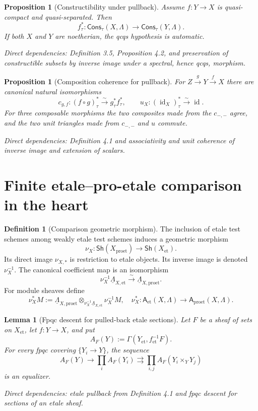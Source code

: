 \documentclass[10pt]{article}
\newtheorem{proposition}[theorem]{Proposition}
\newtheorem{lemma}[theorem]{Lemma}
\theoremstyle{definition}
\newtheorem{definition}[theorem]{Definition}
\newcommand{\Lam}{\Lambda}
\newcommand{\Sh}{\mathsf{Sh}}
\newcommand{\Cons}{\mathsf{Cons}}
\newcommand{\et}{\mathrm{et}}
\newcommand{\proet}{\mathrm{proet}}
\newcommand{\id}{\operatorname{id}}
\newcommand{\dep}[1]{\par\smallskip\noindent\textit{Direct dependencies: #1}}
\begin{document}
\begin{proposition}[Constructibility under pullback]
Assume $f:Y\to X$ is quasi-compact and quasi-separated.  Then
\[
f_\tau^*: \Cons_\tau(X,\Lam)\longrightarrow\Cons_\tau(Y,\Lam).
\]
If both $X$ and $Y$ are noetherian, the qcqs hypothesis is automatic.
\dep{Definition 3.5, Proposition 4.2, and preservation of constructible
subsets by inverse image under a spectral, hence qcqs, morphism.}
\end{proposition}

\begin{proposition}[Composition coherence for pullback]
For $Z\xrightarrow{g}Y\xrightarrow{f}X$ there are canonical natural
isomorphisms
\[
c_{g,f}:(f\circ g)_\tau^*\xrightarrow{\sim}g_\tau^*f_\tau^*,
\qquad
u_X:(\id_X)_\tau^*\xrightarrow{\sim}\id.
\]
For three composable morphisms the two composites made from the $c_{-,-}$
agree, and the two unit triangles made from $c_{-,-}$ and $u$ commute.
\dep{Definition 4.1 and associativity and unit coherence of inverse image and
extension of scalars.}
\end{proposition}

\section{Finite etale--pro-etale comparison in the heart}

\begin{definition}[Comparison geometric morphism]
The inclusion of etale test schemes among weakly etale test schemes induces a
geometric morphism
\[
\nu_X:\Sh(X_{\proet})\longrightarrow\Sh(X_{\et}).
\]
Its direct image $\nu_{X,*}$ is restriction to etale objects.  Its inverse
image is denoted $\nu_X^{-1}$.  The canonical coefficient map is an
isomorphism
\[
\nu_X^{-1}\underline\Lam_{X,\et}
\xrightarrow{\sim}\underline\Lam_{X,\proet}.
\]
For module sheaves define
\[
\nu_X^*M:=\underline\Lam_{X,\proet}
\otimes_{\nu_X^{-1}\underline\Lam_{X,\et}}\nu_X^{-1}M,
\quad
\nu_X^*: \mathsf A_\et(X,\Lam)\to\mathsf A_\proet(X,\Lam).
\]
\end{definition}

\begin{lemma}[Fpqc descent for pulled-back etale sections]
Let $F$ be a sheaf of sets on $X_\et$, let $f:Y\to X$, and put
\[
A_F(Y):=\Gamma(Y_\et,f_\et^{-1}F).
\]
For every fpqc covering $\{Y_i\to Y\}$, the sequence
\[
A_F(Y)\longrightarrow\prod_iA_F(Y_i)
\rightrightarrows\prod_{i,j}A_F(Y_i\times_YY_j)
\]
is an equalizer.
\dep{etale pullback from Definition 4.1 and fpqc descent for sections of an
etale sheaf.}
\end{lemma}
\end{document}
